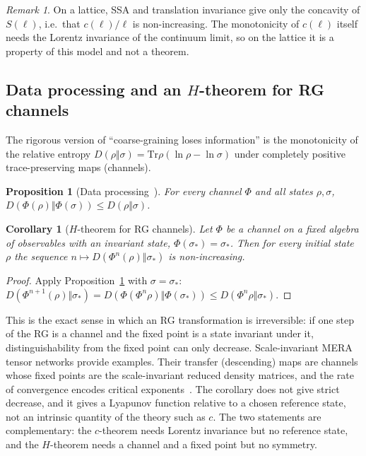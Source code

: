 \documentclass[11pt]{article}
\newtheorem{proposition}{Proposition}[section]
\newtheorem{corollary}{Corollary}[section]
\theoremstyle{remark}\newtheorem*{remark}{Remark}
\newcommand{\Tr}{\mathrm{Tr}}
\begin{document}
\begin{remark}
On a lattice, SSA and translation invariance give only the concavity of $S(\ell)$, i.e.\ that $c(\ell)/\ell$ is
non-increasing. The monotonicity of $c(\ell)$ itself needs the Lorentz invariance of the continuum limit, so on the
lattice it is a property of this model and not a theorem.
\end{remark}

\subsection{\texorpdfstring{Data processing and an $H$-theorem for RG channels}{Data processing and an H-theorem for RG channels}}
\label{sec:dpi}

The rigorous version of ``coarse-graining loses information'' is the monotonicity of the relative entropy
$D(\rho\Vert\sigma)=\Tr\rho(\ln\rho-\ln\sigma)$ under completely positive trace-preserving maps (channels).

\begin{proposition}[Data processing~\cite{Lindblad,Uhlmann}]
\label{prop:dpi}
For every channel $\Phi$ and all states $\rho,\sigma$, $D(\Phi(\rho)\Vert\Phi(\sigma))\le D(\rho\Vert\sigma)$.
\end{proposition}

\begin{corollary}[$H$-theorem for RG channels]
\label{cor:H}
Let $\Phi$ be a channel on a fixed algebra of observables with an invariant state, $\Phi(\sigma_*)=\sigma_*$.
Then for every initial state $\rho$ the sequence $n\mapsto D(\Phi^n(\rho)\Vert\sigma_*)$ is non-increasing.
\end{corollary}

\begin{proof}
Apply Proposition~\ref{prop:dpi} with $\sigma=\sigma_*$:
$D(\Phi^{n+1}(\rho)\Vert\sigma_*)=D(\Phi(\Phi^n\rho)\Vert\Phi(\sigma_*))\le D(\Phi^n\rho\Vert\sigma_*)$.
\end{proof}

This is the exact sense in which an RG transformation is irreversible: if one step of the RG is a channel and the
fixed point is a state invariant under it, distinguishability from the fixed point can only decrease. Scale-invariant
MERA tensor networks provide examples. Their transfer (descending) maps are channels whose fixed points are
the scale-invariant reduced density matrices, and the rate of convergence encodes critical exponents~\cite{GMF}. The
corollary does not give strict decrease, and it gives a Lyapunov function relative to a chosen reference state, not
an intrinsic quantity of the theory such as $c$. The two statements are complementary: the $c$-theorem needs Lorentz
invariance but no reference state, and the $H$-theorem needs a channel and a fixed point but no symmetry.
\end{document}

